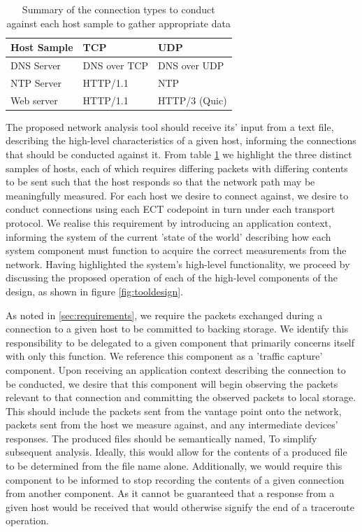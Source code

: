 \documentclass{l4proj}
\begin{document}
\begin{table}[H]
\centering
\begin{tabular}{|l|l|l|}
\hline
\textbf{Host Sample} & \textbf{TCP}          & \textbf{UDP}           \\ \hline
DNS Server  & DNS over TCP & DNS over UDP  \\ \hline
NTP Server  & HTTP/1.1     & NTP           \\ \hline
Web server  & HTTP/1.1     & HTTP/3 (Quic) \\ \hline
\end{tabular}
\caption{Summary of the connection types to conduct against each host sample to gather appropriate data}
\label{table:proto}
\end{table}

The proposed network analysis tool should receive its' input from a text file, describing the high-level characteristics of a given host, informing the connections that should be conducted against it. From table \ref{table:proto} we highlight the three distinct samples of hosts, each of which requires differing packets with differing contents to be sent such that the host responds so that the network path may be meaningfully measured. For each host we desire to connect against, we desire to conduct connections using each ECT codepoint in turn under each transport protocol. We realise this requirement by introducing an application context, informing the system of the current 'state of the world' describing how each system component must function to acquire the correct measurements from the network. Having highlighted the system's high-level functionality, we proceed by discussing the proposed operation of each of the high-level components of the design, as shown in figure \ref{fig:tooldesign}.

As noted in \ref{sec:requirements}, we require the packets exchanged during a connection to a given host to be committed to backing storage. We identify this responsibility to be delegated to a given component that primarily concerns itself with only this function. We reference this component as a 'traffic capture' component. Upon receiving an application context describing the connection to be conducted, we desire that this component will begin observing the packets relevant to that connection and committing the observed packets to local storage. This should include the packets sent from the vantage point onto the network, packets sent from the host we measure against, and any intermediate devices' responses. The produced files should be semantically named, To simplify subsequent analysis. Ideally, this would allow for the contents of a produced file to be determined from the file name alone. Additionally, we would require this component to be informed to stop recording the contents of a given connection from another component. As it cannot be guaranteed that a response from a given host would be received that would otherwise signify the end of a traceroute operation.
\end{document}
